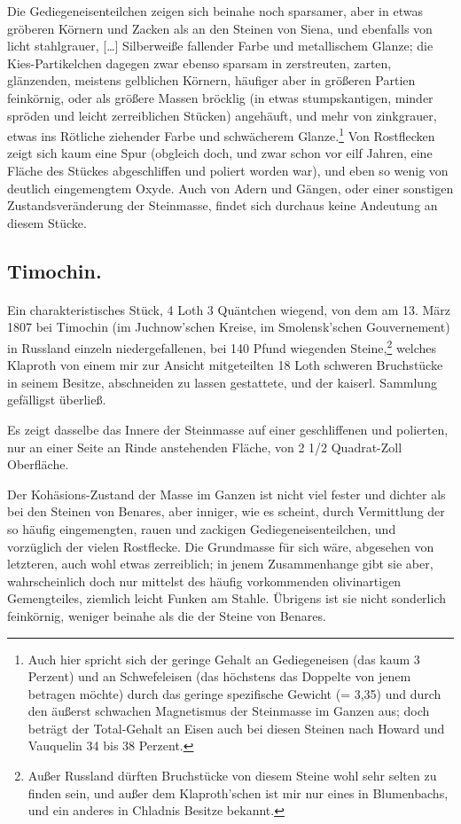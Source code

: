 \documentclass[a4paper, 11pt, oneside, german]{article}
\begin{document}
Die Gediegeneisenteilchen zeigen sich beinahe noch sparsamer, aber in etwas gröberen Körnern und Zacken als an den Steinen von Siena, und ebenfalls von licht stahlgrauer, […] Silberweiße fallender Farbe und metallischem Glanze; die Kies-Partikelchen dagegen zwar ebenso sparsam in zerstreuten, zarten, glänzenden, meistens gelblichen Körnern, häufiger aber in größeren Partien feinkörnig, oder als größere Massen bröcklig (in etwas stumpskantigen, minder spröden und leicht zerreiblichen Stücken) angehäuft, und mehr von zinkgrauer, etwas ins Rötliche ziehender Farbe und schwächerem Glanze.\footnote{Auch hier spricht sich der geringe Gehalt an Gediegeneisen (das kaum 3 Perzent) und an Schwefeleisen (das höchstens das Doppelte von jenem betragen möchte) durch das geringe spezifische Gewicht (= 3,35) und durch den äußerst schwachen Magnetismus der Steinmasse im Ganzen aus; doch beträgt der Total-Gehalt an Eisen auch bei diesen Steinen nach Howard und Vauquelin 34 bis 38 Perzent.} Von Rostflecken zeigt sich kaum eine Spur (obgleich doch, und zwar schon vor eilf Jahren, eine Fläche des Stückes abgeschliffen und poliert worden war), und eben so wenig von deutlich eingemengtem Oxyde. Auch von Adern und Gängen, oder einer sonstigen Zustandsveränderung der Steinmasse, findet sich durchaus keine Andeutung an diesem Stücke.

\subsection{Timochin.}
\paragraph{}
Ein charakteristisches Stück, 4 Loth 3 Quäntchen wiegend, von dem am 13. März 1807 bei Timochin (im Juchnow'schen Kreise, im Smolensk'schen Gouvernement) in Russland einzeln niedergefallenen, bei 140 Pfund wiegenden Steine,\footnote{Außer Russland dürften Bruchstücke von diesem Steine wohl sehr selten zu finden sein, und außer dem Klaproth'schen ist mir nur eines in Blumenbachs, und ein anderes in Chladnis Besitze bekannt.} welches Klaproth von einem mir zur Ansicht mitgeteilten 18 Loth schweren Bruchstücke in seinem Besitze, abschneiden zu lassen gestattete, und der kaiserl. Sammlung gefälligst überließ.

Es zeigt dasselbe das Innere der Steinmasse auf einer geschliffenen und polierten, nur an einer Seite an Rinde anstehenden Fläche, von 2 1/2 Quadrat-Zoll Oberfläche.

Der Kohäsions-Zustand der Masse im Ganzen ist nicht viel fester und dichter als bei den Steinen von Benares, aber inniger, wie es scheint, durch Vermittlung der so häufig eingemengten, rauen und zackigen Gediegeneisenteilchen, und vorzüglich der vielen Rostflecke. Die Grundmasse für sich wäre, abgesehen von letzteren, auch wohl etwas zerreiblich; in jenem Zusammenhange gibt sie aber, wahrscheinlich doch nur mittelst des häufig vorkommenden olivinartigen Gemengteiles, ziemlich leicht Funken am Stahle. Übrigens ist sie nicht sonderlich feinkörnig, weniger beinahe als die der Steine von Benares.
\end{document}
